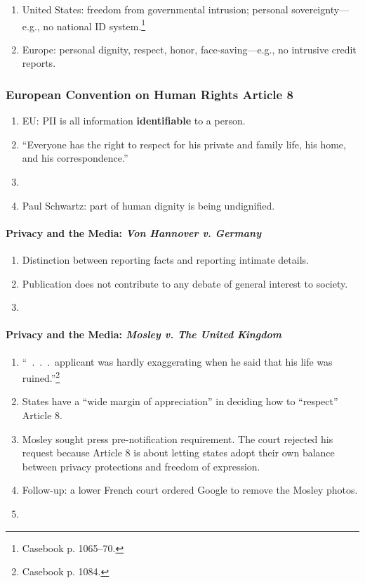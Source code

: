 \begin{enumerate}
    \item United States: freedom from governmental intrusion; personal 
    sovereignty---e.g., no national ID system.\footnote{Casebook p. 1065--70.}
    \item Europe: personal dignity, respect, honor, face-saving---e.g., no 
    intrusive credit reports.
\end{enumerate}

\subsubsection{European Convention on Human Rights Article 8}

\begin{enumerate}
    \item EU: PII is all information \textbf{identifiable} to a person.
    \item ``Everyone has the right to respect for his private and family life, 
    his home, and his correspondence.''
    \item %
    \item Paul Schwartz: part of human dignity is being undignified.
\end{enumerate}

\paragraph{Privacy and the Media: \emph{Von Hannover v. Germany}} %

\begin{enumerate}
    \item Distinction between reporting facts and reporting intimate details.
    \item Publication does not contribute to any debate of general interest to 
    society.
    \item %
\end{enumerate}

\paragraph{Privacy and the Media: \emph{Mosley v. The United Kingdom}} %

\begin{enumerate}
    \item ``~.~.~.~applicant was hardly exaggerating when he said that his life 
    was ruined.''\footnote{Casebook p. 1084.}
    \item States have a ``wide margin of appreciation'' in deciding how to 
    ``respect'' Article 8.
    \item Mosley sought press pre-notification requirement. The court rejected 
    his request because Article 8 is about letting states adopt their own 
    balance between privacy protections and freedom of expression.
    \item Follow-up: a lower French court ordered Google to remove the Mosley 
    photos.
    \item %
\end{enumerate}

